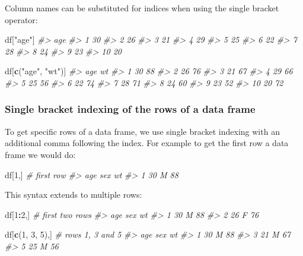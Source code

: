 \documentclass[]{book}
\newenvironment{Shaded}{\begin{snugshade}}{\end{snugshade}}
\newcommand{\CommentTok}[1]{\textcolor[rgb]{0.56,0.35,0.01}{\textit{#1}}}
\newcommand{\DecValTok}[1]{\textcolor[rgb]{0.00,0.00,0.81}{#1}}
\newcommand{\KeywordTok}[1]{\textcolor[rgb]{0.13,0.29,0.53}{\textbf{#1}}}
\newcommand{\NormalTok}[1]{#1}
\newcommand{\OperatorTok}[1]{\textcolor[rgb]{0.81,0.36,0.00}{\textbf{#1}}}
\newcommand{\StringTok}[1]{\textcolor[rgb]{0.31,0.60,0.02}{#1}}
\theoremstyle{definition}
\theoremstyle{definition}
\theoremstyle{definition}
\theoremstyle{remark}
\begin{document}
Column names can be substituted for indices when using the single
bracket operator:

\begin{Shaded}
\begin{Highlighting}[]
\NormalTok{df[}\StringTok{"age"}\NormalTok{]  }
\CommentTok{#>    age}
\CommentTok{#> 1   30}
\CommentTok{#> 2   26}
\CommentTok{#> 3   21}
\CommentTok{#> 4   29}
\CommentTok{#> 5   25}
\CommentTok{#> 6   22}
\CommentTok{#> 7   28}
\CommentTok{#> 8   24}
\CommentTok{#> 9   23}
\CommentTok{#> 10  20}

\NormalTok{df[}\KeywordTok{c}\NormalTok{(}\StringTok{"age"}\NormalTok{, }\StringTok{"wt"}\NormalTok{)]}
\CommentTok{#>    age wt}
\CommentTok{#> 1   30 88}
\CommentTok{#> 2   26 76}
\CommentTok{#> 3   21 67}
\CommentTok{#> 4   29 66}
\CommentTok{#> 5   25 56}
\CommentTok{#> 6   22 74}
\CommentTok{#> 7   28 71}
\CommentTok{#> 8   24 60}
\CommentTok{#> 9   23 52}
\CommentTok{#> 10  20 72}
\end{Highlighting}
\end{Shaded}

\hypertarget{single-bracket-indexing-of-the-rows-of-a-data-frame}{%
\subsubsection{Single bracket indexing of the rows of a data
frame}\label{single-bracket-indexing-of-the-rows-of-a-data-frame}}

To get specific rows of a data frame, we use single bracket indexing
with an additional comma following the index. For example to get the
first row a data frame we would do:

\begin{Shaded}
\begin{Highlighting}[]
\NormalTok{df[}\DecValTok{1}\NormalTok{,]    }\CommentTok{# first row}
\CommentTok{#>   age sex wt}
\CommentTok{#> 1  30   M 88}
\end{Highlighting}
\end{Shaded}

This syntax extends to multiple rows:

\begin{Shaded}
\begin{Highlighting}[]
\NormalTok{df[}\DecValTok{1}\OperatorTok{:}\DecValTok{2}\NormalTok{,]  }\CommentTok{# first two rows}
\CommentTok{#>   age sex wt}
\CommentTok{#> 1  30   M 88}
\CommentTok{#> 2  26   F 76}

\NormalTok{df[}\KeywordTok{c}\NormalTok{(}\DecValTok{1}\NormalTok{, }\DecValTok{3}\NormalTok{, }\DecValTok{5}\NormalTok{),]  }\CommentTok{# rows 1, 3 and 5}
\CommentTok{#>   age sex wt}
\CommentTok{#> 1  30   M 88}
\CommentTok{#> 3  21   M 67}
\CommentTok{#> 5  25   M 56}
\end{Highlighting}
\end{Shaded}
\end{document}
